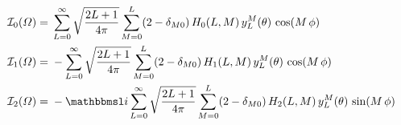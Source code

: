 \begin{align}
  \mathcal{I}_0(\Omega)
  ={}& \sum_{L = 0}^\infty \sqrt{\frac{2 L + 1}{4 \pi}} \sum_{M = 0}^{L} (2 - \delta_{M 0})\, H_0(L, M)\, y_L^M(\theta)\, \cos(M\, \phi)
  \\
  \mathcal{I}_1(\Omega)
  ={}& -\sum_{L = 0}^\infty \sqrt{\frac{2 L + 1}{4 \pi}} \sum_{M = 0}^{L} (2 - \delta_{M 0})\, H_1(L, M)\, y_L^M(\theta)\, \cos(M\, \phi)
  \\
  \mathcal{I}_2(\Omega)
  ={}& -\imag \sum_{L = 0}^\infty \sqrt{\frac{2 L + 1}{4 \pi}} \sum_{M = 0}^{L} (2 - \delta_{M 0})\, H_2(L, M)\, y_L^M(\theta)\, \sin(M\, \phi)
\end{align}
